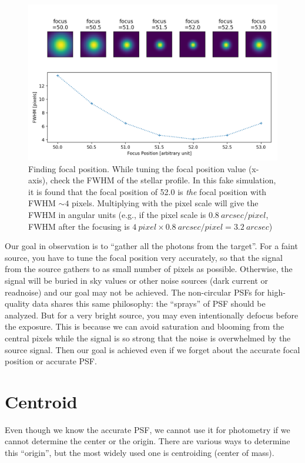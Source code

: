 \begin{figure}[ht!]
  \centering
  \includegraphics[width=0.7\linewidth]{figs/focusing}
  \caption{Finding focal position. While tuning the focal position value (x-axis), check the FWHM of the stellar profile. In this fake simulation, it is found that the focal position of 52.0 is \textit{the} focal position with FWHM $ \sim 4 $ pixels. Multiplying with the pixel scale will give the FWHM in angular units (e.g., if the pixel scale is $ \SI{0.8}{arcsec/pixel} $, FWHM after the focusing is $ \SI{4}{pixel} \times \SI{0.8}{arcsec/pixel} = \SI{3.2}{arcsec} $)}
\label{fig:focusing}
\end{figure}


Our goal in observation is to ``gather all the photons from the target''. For a faint source, you have to tune the focal position very accurately, so that the signal from the source gathers to as small number of pixels as possible. Otherwise, the signal will be buried in sky values or other noise sources (dark current or readnoise) and our goal may not be achieved. The non-circular PSFs for high-quality data shares this same philosophy: the ``sprays'' of PSF should be analyzed. But for a very bright source, you may even intentionally defocus before the exposure. This is because we can avoid saturation and blooming from the central pixels while the signal is so strong that the noise is overwhelmed by the source signal. Then our goal is achieved even if we forget about the accurate focal position or accurate PSF.


\section{Centroid}
Even though we know the accurate PSF, we cannot use it for photometry if we cannot determine the center or the origin. There are various ways to determine this ``origin'', but the most widely used one is centroiding (center of mass). 

